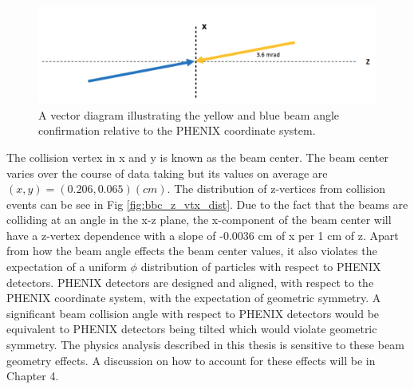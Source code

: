 \begin{figure}[h!]
\begin{center}
\includegraphics[width=0.85\linewidth]{figs/beam_angle.png}
\caption{A vector diagram illustrating the yellow and blue beam angle confirmation relative to the PHENIX coordinate system.}\label{fig:beam_angle}
\end{center}
\end{figure}

The collision vertex in x and y is known as the beam center. The beam center varies over the course of data taking but its values on average are $(x,y) = (0.206,0.065) (cm)$. The distribution of z-vertices from collision events can be see in Fig \ref{fig:bbc_z_vtx_dist}. Due to the fact that the beams are colliding at an angle in the x-z plane, the x-component of the beam center will have a z-vertex dependence with a slope of -0.0036 cm of x per 1 cm of z.
Apart from how the beam angle effects the beam center values, it also violates the expectation of a uniform $\phi$ distribution of particles with respect to PHENIX detectors. PHENIX detectors are designed and aligned, with respect to the PHENIX coordinate system, with the expectation of geometric symmetry. A significant beam collision angle with respect to PHENIX detectors would be equivalent to PHENIX detectors being tilted which would violate geometric symmetry.
The physics analysis described in this thesis is sensitive to these beam geometry effects. A discussion on how to account for these effects will be in Chapter 4.



